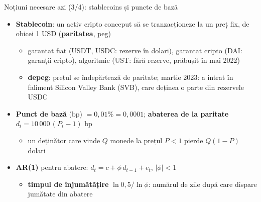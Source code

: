 \begin{frame}{Noțiuni necesare azi (3/4): stablecoins și puncte de bază}
\itemsize{\small}
\begin{itemize}
    \item \textbf{Stablecoin}: un activ cripto conceput să se tranzacționeze la un preț fix, de obicei 1 USD (\textbf{paritatea}, peg)
    \begin{itemize}
        \item garantat fiat (USDT, USDC: rezerve în dolari), garantat cripto (DAI: garanții cripto), algoritmic (UST: fără rezerve, prăbușit în mai 2022)
        \item \textbf{depeg}: prețul se îndepărtează de paritate; martie 2023: a intrat în faliment Silicon Valley Bank (SVB), care deținea o parte din rezervele USDC
    \end{itemize}
    \item \textbf{Punct de bază} (bp) $= 0{,}01\% = 0{,}0001$; \textbf{abaterea de la paritate} $d_t = 10\,000\,(P_t - 1)$ bp
    \begin{itemize}
        \item un deținător care vinde $Q$ monede la prețul $P < 1$ pierde $Q(1 - P)$ dolari
    \end{itemize}
    \item \textbf{AR(1)} pentru abatere: $d_t = c + \phi\,d_{t-1} + e_t$, $|\phi| < 1$
    \begin{itemize}
        \item \textbf{timpul de înjumătățire} $\ln 0{,}5/\ln\phi$: numărul de zile după care dispare jumătate din abatere
    \end{itemize}
\end{itemize}
\end{frame}

